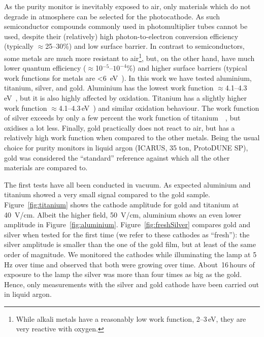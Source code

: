 \documentclass[a4paper,11pt]{article}
\begin{document}
As the purity monitor is inevitably exposed to air, only materials which do not degrade in atmosphere can be selected for the photocathode. As such semiconductor compounds commonly used in photomultiplier tubes cannot be used, despite their (relatively) high photon-to-electron conversion efficiency (typically $\approx$25--30\%) and low surface barrier. In contrast to semiconductors, some metals are much more resistant to air\footnote{While alkali metals have a reasonably low work function, 2--3\,eV, they are very reactive with oxygen.}, but, on the other hand, have much lower quantum efficiency ($\approx$10$^{-5}$--$10^{-4}$\%) and higher surface barriers (typical work functions for metals are \SI{<6}{eV}~\cite{holzl1979work}). In this work we have tested aluminium, titanium, silver, and gold. Aluminium has the lowest work function $\approx$4.1--4.3\,eV~\cite{holzl1979work, green1969solid,Michaelson}, but it is also highly affected by oxidation. Titanium has a slightly higher work function $\approx$4.1--4.3\,eV~\cite{holzl1979work, green1969solid,Michaelson}) and similar oxidation behaviour. The work function of silver exceeds by only a few percent the work function of titanium~~\cite{silver}, but oxidises a lot less. Finally, gold practically does not react to air, but has a relatively high work function when compared to the other metals.
Being the usual choice for purity monitors in liquid argon (ICARUS, 35 ton, ProtoDUNE SP), gold was considered the ``standard'' reference against which all the other materials are compared to.

The first tests have all been conducted in vacuum. As expected aluminium and titanium showed  a very small signal compared to the gold sample.
Figure~\ref{fig:titanium} shows the cathode amplitude for gold and titanium at \SI{40}{V/cm}. Albeit the higher field, \SI{50}{V/cm}, aluminium shows an even lower amplitude in Figure~\ref{fig:aluminium}. Figure~\ref{fig:freshSilver} compares gold and silver when tested for the first time (we refer to these cathodes as ``fresh''): the silver amplitude is smaller than the one of the gold film, but at least of the same order of magnitude. We monitored the cathodes while illuminating the lamp at 5\,Hz over time and observed that both were growing over time. About~16\,hours of exposure to the lamp the silver was more than four times as big as the gold. Hence, only measurements with the silver and gold cathode have been carried out in liquid argon.
\end{document}

